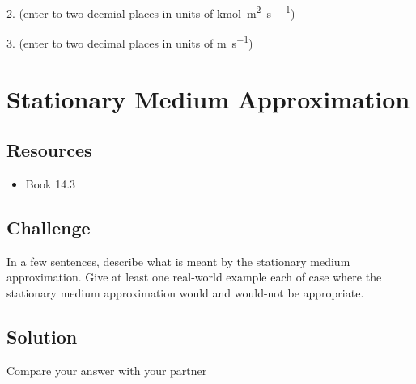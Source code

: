 2. (enter to two decmial places in units of \si{\kmol\per\square\meter\per\second}) 

3. (enter to two decimal places in units of \si{\meter\per\second}) 




\newpage
\section{Stationary Medium Approximation}

\subsection*{Resources}
\begin{itemize}
    \item Book 14.3
\end{itemize}

\subsection*{Challenge}
In a few sentences, describe what is meant by the stationary medium approximation. Give at least one real-world example each of case where the stationary medium approximation would and would-not be appropriate.

\subsection*{Solution}
Compare your answer with your partner
